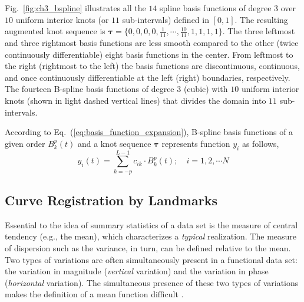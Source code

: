 Fig.~\ref{fig:ch3_bspline} illustrates all the $14$ spline basis functions of degree $3$ over $10$ uniform interior knots (or $11$ sub-intervals) defined in $[0,1]$.
The resulting augmented knot sequence is $\boldsymbol{\tau}=\{0, 0, 0, 0, \frac{1}{11}, \cdots, \frac{10}{11}, 1, 1, 1, 1\}$.
The three leftmost and three rightmost basis functions are less smooth compared to the other (twice continuously differentiable) eight basis functions in the center. 
From leftmost to the right (rightmost to the left) the basis functions are discontinuous, continuous, and once continuously differentiable at the left (right) boundaries, respectively.
{The fourteen B-spline basis functions of degree $3$ (cubic) with $10$ uniform interior knots (shown in light dashed vertical lines) that divides the domain into $11$ sub-intervals.}

According to Eq.~(\ref{eq:basis_function_expansion}), B-spline basis functions of a given order $B_k^p (t)$ and a knot sequence $\boldsymbol{\tau}$ 
represents function $y_i$ as follows,
\begin{equation}
	y_i (t) = \sum_{k = -p}^{L-1} c_{ik} \cdot B^p_k (t); \quad i = 1, 2, \cdots N
\label{eq:basis_function_expansion}
\end{equation}

\subsection{Curve Registration by Landmarks}\label{sub:sa_registration}

Essential to the idea of summary statistics of a data set is the measure of central tendency (e.g., the mean),
which characterizes a \emph{typical} realization.
The measure of dispersion such as the variance, in turn, can be defined relative to the mean. 
Two types of variations are often simultaneously present in a functional data set: 
the variation in magnitude (\emph{vertical} variation) and the variation in phase (\emph{horizontal} variation).
The simultaneous presence of these two types of variations makes the definition of a mean function difficult \cite{Kneip1992}.

